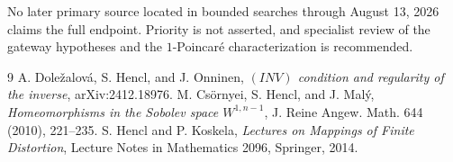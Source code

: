 \documentclass[11pt]{article}
\begin{document}
No later primary source located in bounded searches through August 13, 2026
claims the full endpoint.  Priority is not asserted, and specialist review of
the gateway hypotheses and the $1$-Poincar\'e characterization is recommended.

\begin{thebibliography}{9}
A. Dole\v{z}alov\'a, S. Hencl, and J. Onninen,
\emph{$(INV)$ condition and regularity of the inverse}, arXiv:2412.18976.
M. Cs\"ornyei, S. Hencl, and J. Mal\'y,
\emph{Homeomorphisms in the Sobolev space $W^{1,n-1}$},
J. Reine Angew. Math. 644 (2010), 221--235.
S. Hencl and P. Koskela,
\emph{Lectures on Mappings of Finite Distortion},
Lecture Notes in Mathematics 2096, Springer, 2014.
\end{thebibliography}
\end{document}
